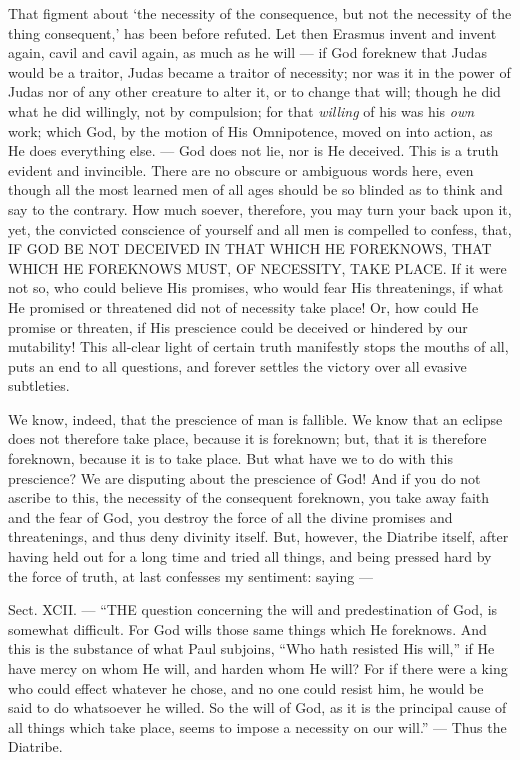That figment about ‘the necessity of the consequence, but not the necessity of the thing consequent,’ has been before refuted. Let then Erasmus invent and invent again, cavil and cavil again, as much as he will — if God foreknew that Judas would be a traitor, Judas became a traitor of necessity; nor was it in the power of Judas nor of any other creature to alter it, or to change that will; though he did what he did willingly, not by compulsion; for that \emph{willing }of his was his \emph{ own }work; which God, by the motion of His Omnipotence, moved on into action, as He does everything else. — God does not lie, nor is He deceived. This is a truth evident and invincible. There are no obscure or ambiguous words here, even though all the most learned men of all ages should be so blinded as to think and say to the contrary. How much soever, therefore, you may turn your back upon it, yet, the convicted conscience of yourself and all men is compelled to confess, that, \textsc{IF GOD BE NOT DECEIVED IN THAT WHICH HE FOREKNOWS, THAT WHICH HE FOREKNOWS MUST, OF NECESSITY, TAKE PLACE}. If it were not so, who could believe His promises, who would fear His threatenings, if what He promised or threatened did not of necessity take place! Or, how could He promise or threaten, if His prescience could be deceived or hindered by our mutability! This all-clear light of certain truth manifestly stops the mouths of all, puts an end to all questions, and forever settles the victory over all evasive subtleties.

We know, indeed, that the prescience of man is fallible. We know that an eclipse does not therefore take place, because it is foreknown; but, that it is therefore foreknown, because it is to take place. But what have we to do with this prescience? We are disputing about the prescience of God! And if you do not ascribe to this, the necessity of the consequent foreknown, you take away faith and the fear of God, you destroy the force of all the divine promises and threatenings, and thus deny divinity itself. But, however, the Diatribe itself, after having held out for a long time and tried all things, and being pressed hard by the force of truth, at last confesses my sentiment: saying —


Sect. XCII. — “THE question concerning the will and predestination of God, is somewhat difficult. For God wills those same things which He foreknows. And this is the substance of what Paul subjoins, “Who hath resisted His will,” if He have mercy on whom He will, and harden whom He will? For if there were a king who could effect whatever he chose, and no one could resist him, he would be said to do whatsoever he willed. So the will of God, as it is the principal cause of all things which take place, seems to impose a necessity on our will.” — Thus the Diatribe.

